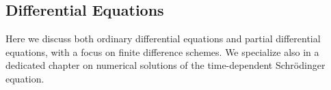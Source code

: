 % 
%
%

\begin{partbacktext}
\part{Differential Equations}
Here we discuss both ordinary differential equations and partial differential equations, with a focus on finite difference schemes. We specialize also in a dedicated chapter on numerical solutions of the time-dependent Schr\"odinger equation. 
\end{partbacktext}
